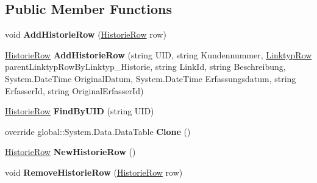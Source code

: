 \subsection*{Public Member Functions}
\begin{DoxyCompactItemize}
\item 
void {\bfseries Add\+Historie\+Row} (\hyperlink{class_products_1_1_data_1_1ds_sage_1_1_historie_row}{Historie\+Row} row)\hypertarget{class_products_1_1_data_1_1ds_sage_1_1_historie_data_table_a9c1da2563ab84fed21b20de138ebdd76}{}\label{class_products_1_1_data_1_1ds_sage_1_1_historie_data_table_a9c1da2563ab84fed21b20de138ebdd76}

\item 
\hyperlink{class_products_1_1_data_1_1ds_sage_1_1_historie_row}{Historie\+Row} {\bfseries Add\+Historie\+Row} (string U\+ID, string Kundennummer, \hyperlink{class_products_1_1_data_1_1ds_sage_1_1_linktyp_row}{Linktyp\+Row} parent\+Linktyp\+Row\+By\+Linktyp\+\_\+\+Historie, string Link\+Id, string Beschreibung, System.\+Date\+Time Original\+Datum, System.\+Date\+Time Erfassungsdatum, string Erfasser\+Id, string Original\+Erfasser\+Id)\hypertarget{class_products_1_1_data_1_1ds_sage_1_1_historie_data_table_a5acd51e6ae8b084e4d20df62b0e0b455}{}\label{class_products_1_1_data_1_1ds_sage_1_1_historie_data_table_a5acd51e6ae8b084e4d20df62b0e0b455}

\item 
\hyperlink{class_products_1_1_data_1_1ds_sage_1_1_historie_row}{Historie\+Row} {\bfseries Find\+By\+U\+ID} (string U\+ID)\hypertarget{class_products_1_1_data_1_1ds_sage_1_1_historie_data_table_a10aa3d1c612402f7eeb1bf3dba86b58f}{}\label{class_products_1_1_data_1_1ds_sage_1_1_historie_data_table_a10aa3d1c612402f7eeb1bf3dba86b58f}

\item 
override global\+::\+System.\+Data.\+Data\+Table {\bfseries Clone} ()\hypertarget{class_products_1_1_data_1_1ds_sage_1_1_historie_data_table_a0600bdaf7b2f254304dfb2d3dc34501d}{}\label{class_products_1_1_data_1_1ds_sage_1_1_historie_data_table_a0600bdaf7b2f254304dfb2d3dc34501d}

\item 
\hyperlink{class_products_1_1_data_1_1ds_sage_1_1_historie_row}{Historie\+Row} {\bfseries New\+Historie\+Row} ()\hypertarget{class_products_1_1_data_1_1ds_sage_1_1_historie_data_table_a7fcfb416002af46f075dcadebd34f464}{}\label{class_products_1_1_data_1_1ds_sage_1_1_historie_data_table_a7fcfb416002af46f075dcadebd34f464}

\item 
void {\bfseries Remove\+Historie\+Row} (\hyperlink{class_products_1_1_data_1_1ds_sage_1_1_historie_row}{Historie\+Row} row)\hypertarget{class_products_1_1_data_1_1ds_sage_1_1_historie_data_table_ae87ec64fad49e45e7d57517d8762eaff}{}\label{class_products_1_1_data_1_1ds_sage_1_1_historie_data_table_ae87ec64fad49e45e7d57517d8762eaff}

\end{DoxyCompactItemize}
